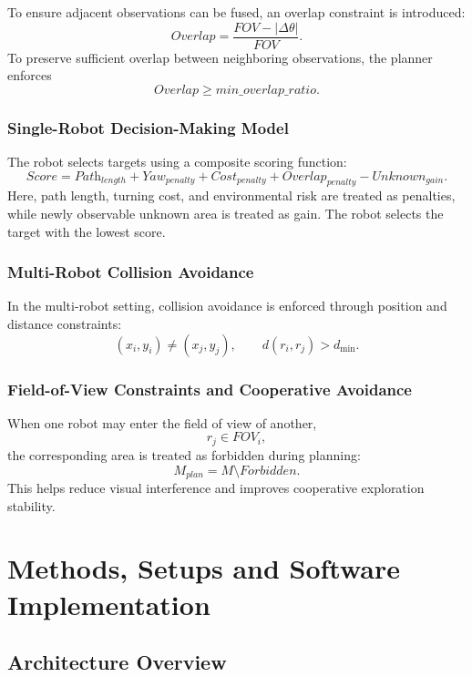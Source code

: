 \documentclass[12pt]{interim_report}
\begin{document}
To ensure adjacent observations can be fused, an overlap constraint is introduced:
\[
\textit{Overlap} = \frac{\textit{FOV} - |\Delta \theta|}{\textit{FOV}}.
\]
To preserve sufficient overlap between neighboring observations, the planner enforces
\[
\textit{Overlap} \ge \textit{min\_overlap\_ratio}.
\]

\subsubsection{Single-Robot Decision-Making Model}

The robot selects targets using a composite scoring function:
\[
\textit{Score} = \textit{Path}_{length} + \textit{Yaw}_{penalty} + \textit{Cost}_{penalty} + \textit{Overlap}_{penalty} - \textit{Unknown}_{gain}.
\]
Here, path length, turning cost, and environmental risk are treated as penalties, while newly observable unknown area is treated as gain. The robot selects the target with the lowest score.

\subsubsection{Multi-Robot Collision Avoidance}

In the multi-robot setting, collision avoidance is enforced through position and distance constraints:
\[
(x_i, y_i) \neq (x_j, y_j), \qquad d(r_i, r_j) > d_{\min}.
\]

\subsubsection{Field-of-View Constraints and Cooperative Avoidance}

When one robot may enter the field of view of another,
\[
r_j \in \textit{FOV}_i,
\]
the corresponding area is treated as forbidden during planning:
\[
M_{plan} = M \setminus \textit{Forbidden}.
\]
This helps reduce visual interference and improves cooperative exploration stability.



\section{Methods, Setups and Software Implementation}

\subsection{Architecture Overview}
\label{subsec:swarm-centralized-architecture-zhuyu-dong}
\end{document}
